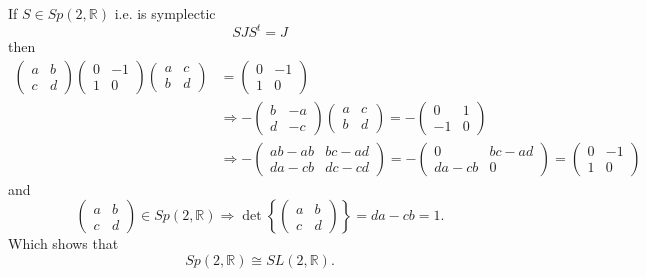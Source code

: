 \documentclass[aps,preprint]{revtex4}
\begin{document}
If $S\in Sp\left( 2,\mathbb{R}\right) $ i.e. is symplectic 
\begin{equation}
SJS^{t}=J
\end{equation}%
then 
\begin{align}
\left( 
\begin{array}{cc}
a & b \\ 
c & d%
\end{array}%
\right) \left( 
\begin{array}{cc}
0 & -1 \\ 
1 & 0%
\end{array}%
\right) \left( 
\begin{array}{cc}
a & c \\ 
b & d%
\end{array}%
\right) & =\left( 
\begin{array}{cc}
0 & -1 \\ 
1 & 0%
\end{array}%
\right) \\
& \Rightarrow -\left( 
\begin{array}{cc}
b & -a \\ 
d & -c%
\end{array}%
\right) \left( 
\begin{array}{cc}
a & c \\ 
b & d%
\end{array}%
\right) =-\left( 
\begin{array}{cc}
0 & 1 \\ 
-1 & 0%
\end{array}%
\right) \\
& \Rightarrow -\left( 
\begin{array}{cc}
ab-ab & bc-ad \\ 
da-cb & dc-cd%
\end{array}%
\right) =-\left( 
\begin{array}{cc}
0 & bc-ad \\ 
da-cb & 0%
\end{array}%
\right) =\left( 
\begin{array}{cc}
0 & -1 \\ 
1 & 0%
\end{array}%
\right)
\end{align}%
and 
\begin{equation}
\left( 
\begin{array}{cc}
a & b \\ 
c & d%
\end{array}%
\right) \in Sp\left( 2,\mathbb{R}\right) \Rightarrow \det \left\{ \left( 
\begin{array}{cc}
a & b \\ 
c & d%
\end{array}%
\right) \right\} =da-cb=1.
\end{equation}%
Which shows that 
\begin{equation}
Sp\left( 2,\mathbb{R}\right) \cong SL\left( 2,\mathbb{R}\right) .
\end{equation}
\end{document}
